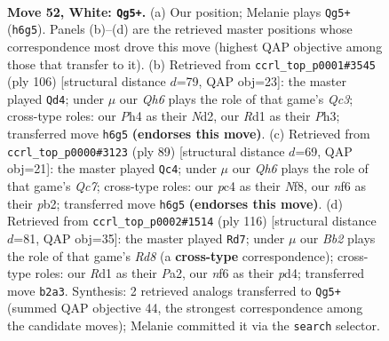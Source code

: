 \documentclass[11pt]{article}
\begin{document}
\clearpage

\begin{figure}[p]\centering
\begin{subfigure}{0.46\textwidth}\centering
\resizebox{\linewidth}{!}{%
\newchessgame
\chessboard[
  setfen={3q2k1/1b1n1p2/3P1n1Q/8/p1p4P/5pP1/PB5K/3R4 w - - 4 52},
  showmover=false,
  pgfstyle=straightmove, color=movearrow, markmove={h6-g5}
]}
\caption{}
\end{subfigure}\hfill
\begin{subfigure}{0.46\textwidth}\centering
\resizebox{\linewidth}{!}{%
\newchessgame
\chessboard[
  setfen={1q4k1/3n1pp1/4p1p1/2n5/6P1/2Q1PB1P/3N1P2/6K1 w - - 4 54},
  showmover=false,
  pgfstyle=straightmove, color=movearrow, markmove={c3-d4}
]}
\caption{}
\end{subfigure}
\\[4pt]
\begin{subfigure}{0.46\textwidth}\centering
\resizebox{\linewidth}{!}{%
\newchessgame
\chessboard[
  setfen={5nk1/8/bpp5/p5P1/6P1/3NQ3/PPq5/5BK1 b - - 4 45},
  showmover=false,
  pgfstyle=straightmove, color=movearrow, markmove={c2-c4}
]}
\caption{}
\end{subfigure}\hfill
\begin{subfigure}{0.46\textwidth}\centering
\resizebox{\linewidth}{!}{%
\newchessgame
\chessboard[
  setfen={3R4/1p3pk1/7p/4qnp1/1P1p4/3Q3P/P5P1/6K1 w - - 7 59},
  showmover=false,
  pgfstyle=straightmove, color=movearrow, markmove={d8-d7}
]}
\caption{}
\end{subfigure}
\caption{\textbf{Move 52, White: \texttt{Qg5+}.} (a) Our position; Melanie plays \texttt{Qg5+} (\texttt{h6g5}). Panels (b)--(d) are the retrieved master positions whose correspondence most drove this move (highest QAP objective among those that transfer to it). (b) Retrieved from \texttt{ccrl\_top\_p0001\#3545} (ply 106) [structural distance $d$=79, QAP obj=23]: the master played \texttt{Qd4}; under $\mu$ our \emph{Qh6} plays the role of that game's \emph{Qc3}; cross-type roles: our \emph{P}h4 as their \emph{N}d2, our \emph{R}d1 as their \emph{P}h3; transferred move \texttt{h6g5} \textbf{(endorses this move)}. (c) Retrieved from \texttt{ccrl\_top\_p0000\#3123} (ply 89) [structural distance $d$=69, QAP obj=21]: the master played \texttt{Qc4}; under $\mu$ our \emph{Qh6} plays the role of that game's \emph{Qc7}; cross-type roles: our \emph{p}c4 as their \emph{N}f8, our \emph{n}f6 as their \emph{p}b2; transferred move \texttt{h6g5} \textbf{(endorses this move)}. (d) Retrieved from \texttt{ccrl\_top\_p0002\#1514} (ply 116) [structural distance $d$=81, QAP obj=35]: the master played \texttt{Rd7}; under $\mu$ our \emph{Bb2} plays the role of that game's \emph{Rd8} (a \textbf{cross-type} correspondence); cross-type roles: our \emph{R}d1 as their \emph{P}a2, our \emph{n}f6 as their \emph{p}d4; transferred move \texttt{b2a3}. Synthesis: 2 retrieved analogs transferred to \texttt{Qg5+} (summed QAP objective 44, the strongest correspondence among the candidate moves); Melanie committed it via the \texttt{search} selector.}
\label{fig:thought-m102}
\end{figure}
\end{document}
